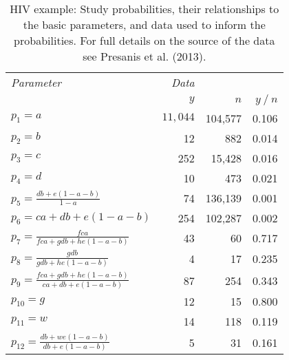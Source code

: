 \begin{table}
\centering
\caption{\label{tab:HIV-data}HIV example: Study probabilities, their relationships to the basic parameters, and data used to inform the probabilities. For full details on the source of the data see Presanis et al. (2013).}
\begin{tabular}{p{4cm}rrr}
\toprule
\em Parameter & \em Data & & \\ 
 & \em $y$ & \em $n$ & \em $y \mathop{/} n$ \\ 
\midrule
  $p_1 = a$ & $11,044$ & 104,577 & 0.106 \\[8pt] 
  $p_2 = b$ & 12 & 882 & 0.014 \\[8pt] 
  $p_3 = c$ & 252 & 15,428 & 0.016 \\[8pt] 
  $p_4 = d$ & 10 & 473 & 0.021 \\[8pt] 
  $p_5 = \frac{db + e(1-a-b)}{1-a}$ & 74 & 136,139 & 0.001 \\[8pt] 
  $p_6 = ca + db + e(1-a-b)$ & 254 & 102,287 & 0.002 \\[8pt] 
  $p_7 = \frac{fca}{fca + gdb + he(1-a-b)}$ & 43 & 60 & 0.717 \\[8pt] 
  $p_8 = \frac{gdb}{gdb + he(1-a-b)}$ & 4 & 17 & 0.235 \\[8pt] 
  $p_9 = \frac{fca+gdb+he(1-a-b)}{ca + db + e(1-a-b)}$ & 87 & 254 & 0.343 \\[8pt] 
  $p_{10} = g$ & 12 & 15 & 0.800 \\[8pt] 
  $p_{11} = w$ & 14 & 118 & 0.119 \\[8pt] 
  $p_{12} = \frac{db + we(1-a-b)}{db + e(1-a-b)}$ & 5 & 31 & 0.161 \\ 
\bottomrule
\end{tabular}
\end{table}
